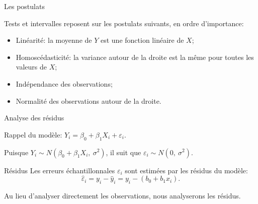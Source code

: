 \documentclass{BeamerTemplate}
\begin{document}
\begin{frame}[t]{Les postulats}

Tests et intervalles reposent sur les postulats suivants, \alert{en ordre
d'importance}:
\begin{itemize}\itemsep0.5mm
  \item[(P1)] \alert{Linéarité}: la moyenne de $Y$ est une fonction linéaire de $X$;
  \item[(P2)] \alert{Homoscédasticité}: la variance autour de la droite est la
  même pour toutes les valeurs de $X$;
  \item[(P3)] \alert{Indépendance} des observations;
  \item[(P4)] \alert{Normalité} des observations autour de la droite.
\end{itemize}


\end{frame}

\begin{frame}[t]{Analyse des résidus}

Rappel du modèle: $Y_i=\beta_0+\beta_1X_i+\varepsilon_i$.

\medskip
Puisque $Y_i\sim N(\beta_0+\beta_1X_i,\ \sigma^2)$, il suit que
$\varepsilon_i\sim N(0,\ \sigma^2)$.

\begin{Boite}{Résidus}
Les erreurs échantillonnales $\varepsilon_i$ sont estimées par les \alert{résidus}
du modèle:
\[
\hat\varepsilon_i=y_i-\hat y_i=y_i-(b_0+b_1x_i).
\]
\end{Boite}

Au lieu d'analyser directement les observations, nous analyserons les résidus.

\end{frame}
\end{document}
